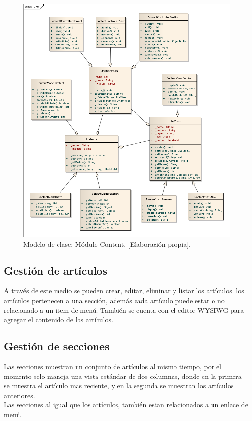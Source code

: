 \begin{figure}[h]
\centering
\includegraphics[scale=.4, keepaspectratio=true]{imagenes/14_imagen.png}
\caption{Modelo de clase: M\'odulo Content. [Elaboraci\'on propia].}
\end{figure}

\subsection{Gesti\'on de art\'iculos}
A trav\'es de este medio se pueden crear, editar, eliminar y listar los art\'iculos, los art\'iculos pertenecen a una secci\'on, adem\'as cada art\'iculo puede estar o no relacionado a un item de men\'u. Tambi\'en se cuenta con el editor WYSIWG para agregar el contenido de los art\'iculos.

\subsection{Gesti\'on de secciones}
Las secciones muestran un conjunto de art\'iculos al mismo tiempo, por el momento solo maneja una vista est\'andar de dos columnas, donde en la primera se muestra el art\'iculo mas reciente, y en la segunda se muestran los art\'iculos anteriores.\\
Las secciones al igual que los art\'iculos, tambi\'en estan relacionados a un enlace de men\'u.

